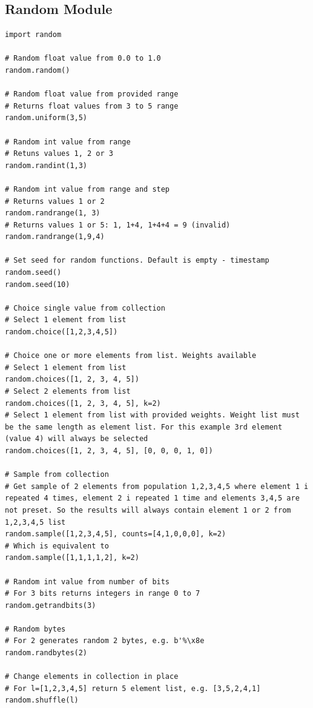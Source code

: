 \documentclass{article}
\begin{document}
\subsection{Random Module}
\begin{lstlisting}[style=pystyle]
import random

# Random float value from 0.0 to 1.0
random.random()

# Random float value from provided range
# Returns float values from 3 to 5 range
random.uniform(3,5)

# Random int value from range
# Retuns values 1, 2 or 3
random.randint(1,3)

# Random int value from range and step
# Returns values 1 or 2
random.randrange(1, 3)
# Returns values 1 or 5: 1, 1+4, 1+4+4 = 9 (invalid)
random.randrange(1,9,4)

# Set seed for random functions. Default is empty - timestamp
random.seed()
random.seed(10)

# Choice single value from collection
# Select 1 element from list
random.choice([1,2,3,4,5])

# Choice one or more elements from list. Weights available
# Select 1 element from list
random.choices([1, 2, 3, 4, 5]) 
# Select 2 elements from list
random.choices([1, 2, 3, 4, 5], k=2)
# Select 1 element from list with provided weights. Weight list must be the same length as element list. For this example 3rd element (value 4) will always be selected
random.choices([1, 2, 3, 4, 5], [0, 0, 0, 1, 0])

# Sample from collection
# Get sample of 2 elements from population 1,2,3,4,5 where element 1 i repeated 4 times, element 2 i repeated 1 time and elements 3,4,5 are not preset. So the results will always contain element 1 or 2 from 1,2,3,4,5 list
random.sample([1,2,3,4,5], counts=[4,1,0,0,0], k=2)
# Which is equivalent to
random.sample([1,1,1,1,2], k=2)

# Random int value from number of bits
# For 3 bits returns integers in range 0 to 7
random.getrandbits(3)

# Random bytes
# For 2 generates random 2 bytes, e.g. b'%\x8e
random.randbytes(2) 

# Change elements in collection in place
# For l=[1,2,3,4,5] return 5 element list, e.g. [3,5,2,4,1]
random.shuffle(l)	
\end{lstlisting}
\end{document}
